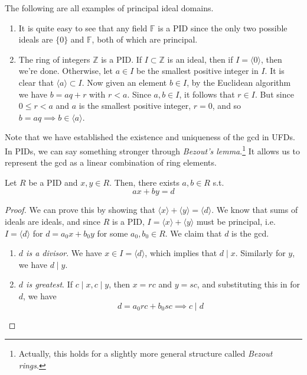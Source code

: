   \begin{example}
    The following are all examples of principal ideal domains. 
    \begin{enumerate}
      \item It is quite easy to see that any field $\mathbb{F}$ is a PID since the only two possible ideals are $\{0\}$ and $\mathbb{F}$, both of which are principal. 

      \item The ring of integers $\mathbb{Z}$ is a PID. If $I \subset \mathbb{Z}$ is an ideal, then if $I = \langle 0 \rangle$, then we're done. Otherwise, let $a \in I$ be the smallest positive integer in $I$. It is clear that $\langle a \rangle \subset I$. Now given an element $b \in I$, by the Euclidean algorithm we have $b = aq + r$ with $r < a$. Since $a, b \in I$, it follows that $r \in I$. But since $0 \leq r < a$ and $a$ is the smallest positive integer, $r = 0$, and so $b = aq \implies b \in \langle a \rangle$. 
    \end{enumerate}
  \end{example}

  Note that we have established the existence and uniqueness of the gcd in UFDs. In PIDs, we can say something stronger through \textit{Bezout's lemma}.\footnote{Actually, this holds for a slightly more general structure called \textit{Bezout rings}. } It allows us to represent the gcd as a linear combination of ring elements. 

  \begin{lemma}
    Let $R$ be a PID and $x, y \in R$. Then, there exists $a, b \in R$ s.t. 
    \begin{equation}
      ax + by = d
    \end{equation}
  \end{lemma}
  \begin{proof}
    We can prove this by showing that $\langle x \rangle + \langle y \rangle = \langle d \rangle$. We know that sums of ideals are ideals, and since $R$ is a PID, $I = \langle x \rangle + \langle y \rangle$ must be principal, i.e. $I = \langle d \rangle$ for $d = a_0 x + b_0 y$ for some $a_0, b_0 \in R$. We claim that $d$ is the gcd. 
    \begin{enumerate}
      \item \textit{$d$ is a divisor}. We have $x \in I = \langle d \rangle$, which implies that $d \mid x$. Similarly for $y$, we have $d \mid y$. 
      \item \textit{$d$ is greatest}. If $c \mid x, c \mid y$, then $x = rc$ and $y = sc$, and substituting this in for $d$, we have 
        \begin{equation}
          d = a_0 r c + b_0 s c \implies c \mid d 
        \end{equation} 
    \end{enumerate}
  \end{proof}

